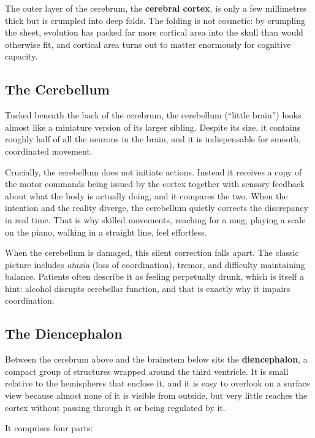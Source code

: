 \documentclass[11pt]{article}
\begin{document}
The outer layer of the cerebrum, the \textbf{cerebral cortex}, is only a few millimetres thick but is crumpled into deep folds. The folding is not cosmetic: by crumpling the sheet, evolution has packed far more cortical area into the skull than would otherwise fit, and cortical area turns out to matter enormously for cognitive capacity.

\subsection{The Cerebellum}

Tucked beneath the back of the cerebrum, the cerebellum (``little brain'') looks almost like a miniature version of its larger sibling. Despite its size, it contains roughly half of all the neurons in the brain, and it is indispensable for smooth, coordinated movement.

Crucially, the cerebellum does not initiate actions. Instead it receives a copy of the motor commands being issued by the cortex together with sensory feedback about what the body is actually doing, and it compares the two. When the intention and the reality diverge, the cerebellum quietly corrects the discrepancy in real time. That is why skilled movements, reaching for a mug, playing a scale on the piano, walking in a straight line, feel effortless.

When the cerebellum is damaged, this silent correction falls apart. The classic picture includes \textit{ataxia} (loss of coordination), tremor, and difficulty maintaining balance. Patients often describe it as feeling perpetually drunk, which is itself a hint: alcohol disrupts cerebellar function, and that is exactly why it impairs coordination.

\subsection{The Diencephalon}

Between the cerebrum above and the brainstem below sits the \textbf{diencephalon}, a compact group of structures wrapped around the third ventricle. It is small relative to the hemispheres that enclose it, and it is easy to overlook on a surface view because almost none of it is visible from outside, but very little reaches the cortex without passing through it or being regulated by it.

It comprises four parts:
\end{document}
